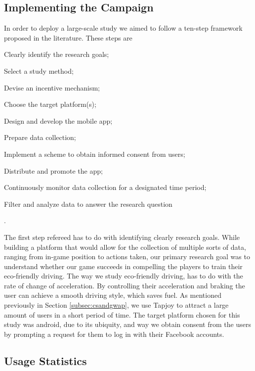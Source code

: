 \documentclass[preprint,authoryear,12pt]{elsarticle}
\begin{document}
\subsection{Implementing the Campaign}
\label{subsec:campaign}

In order to deploy a large-scale study we aimed to follow a ten-step framework proposed in the literature. These steps are \begin{inparaenum}[\itshape 1\upshape)]\item Clearly identify the research goals; \item Select a study method; \item Devise an incentive mechanism;  \item Choose the target platform(s); \item Design and develop the mobile app; \item Prepare data collection; \item Implement a scheme to obtain informed consent from users; \item Distribute and promote the app; \item Continuously monitor data collection for a designated time period; \item Filter and analyze data to answer the research question \end{inparaenum} \citep{Henze2013}.

The first step refereed has to do with identifying clearly research goals. While building a platform that would allow for the collection of multiple sorts of data, ranging from in-game position to actions taken, our primary research goal was to understand whether our game succeeds in compelling the players to train their eco-friendly driving.
The way we study eco-friendly driving, has to do with the rate of change of acceleration. By controlling their acceleration and braking the user can achieve a smooth driving style, which saves fuel.
As mentioned previously in Section \ref{subsec:csandgwap}, we use Tapjoy to attract a large amount of users in a short period of time.
The target platform chosen for this study was android, due to its ubiquity, and way we obtain consent from the users by prompting a request for them to log in with their Facebook accounts. 




\subsection{Usage Statistics}
\label{subsec:usage_stats}
\end{document}
